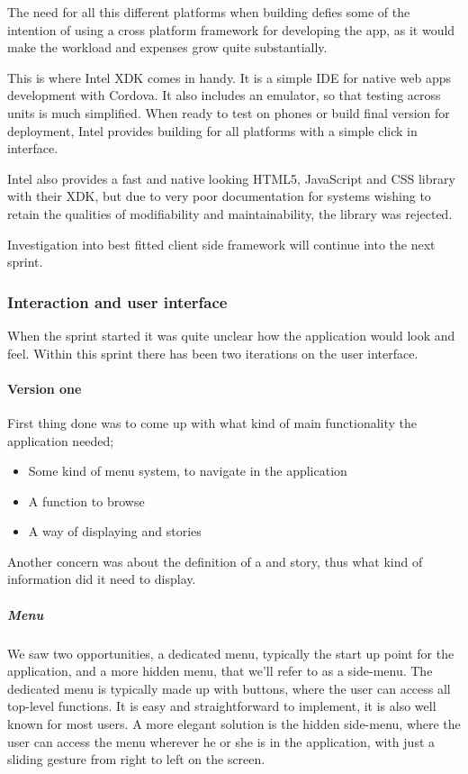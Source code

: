 \documentclass[11pt]{book}
\begin{document}
The need for all this different platforms when building defies some of the intention of using a cross platform framework for developing the app, as it would make the workload and expenses grow quite substantially.

This is where Intel XDK comes in handy. It is a simple IDE for native web apps development with Cordova. It also includes an emulator, so that testing across units is much simplified. When ready to test on phones or build final version for deployment, Intel provides building for all platforms with a simple click in interface.

Intel also provides a fast and native looking HTML5, JavaScript and CSS library with their XDK, but due to very poor documentation for systems wishing to retain the qualities of modifiability and maintainability, the library was rejected.

Investigation into best fitted client side framework will continue into the next sprint.

\subsubsection{Interaction and user interface}
When the sprint started it was quite unclear how the application would look and feel. Within this sprint there has been two iterations on the user interface.

\paragraph{Version one}

First thing done was to come up with what kind of main functionality the application needed;

\begin{itemize}
    \item Some kind of menu system, to navigate in the application
    \item A function to browse \wallentityp
    \item A way of displaying \wallentityp and stories
\end{itemize}

Another concern was about the definition of a \wallentitys and story, thus what kind of information did it need to display.

\subparagraph{Menu}
We saw two opportunities, a dedicated menu, typically the start up point for the application, and a more hidden menu, that we'll refer to as a side-menu. The dedicated menu is typically made up with buttons, where the user can access all top-level functions. It is easy and straightforward to implement, it is also well known for most users. A more elegant solution is the hidden side-menu, where the user can access the menu wherever he or she is in the application, with just a sliding gesture from right to left on the screen.
\end{document}
